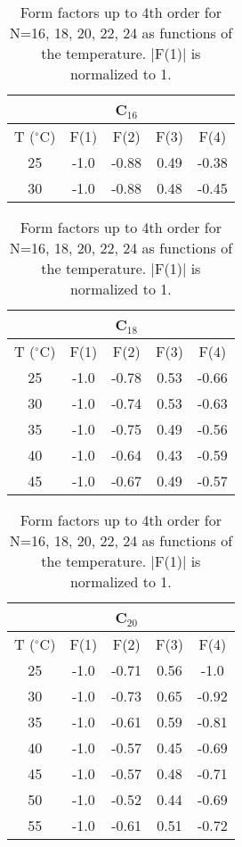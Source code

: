 \begin{table}
\caption{Form factors up to 4th order for N=16, 18, 20, 22, 24 as 
functions of the temperature. |F(1)| is normalized to 1.
\label{long:form}}
\begin{center}
\raggedleft
\hspace{0.1in}
\begin{tabular}{ccccc}
\\ \hline \hline
 & & C$_{16}$ & & \\ \hline
T ($^{\circ}$C) & F(1) & F(2) & F(3) & F(4) \\ \hline
25 & -1.0 & -0.88 & 0.49 & -0.38 \\
30 & -1.0 & -0.88 & 0.48 & -0.45 \\
\hline \hline
\end{tabular}
\raggedright
\hspace{0.2in}
\begin{tabular}{ccccc}
\\ \hline \hline
 & & C$_{18}$ & & \\ \hline
T ($^{\circ}$C) & F(1) & F(2) & F(3) & F(4) \\ \hline
25 & -1.0 & -0.78 & 0.53 & -0.66 \\
30 & -1.0 & -0.74 & 0.53 & -0.63 \\
35 & -1.0 & -0.75 & 0.49 & -0.56 \\
40 & -1.0 & -0.64 & 0.43 & -0.59 \\
45 & -1.0 & -0.67 & 0.49 & -0.57 \\
\hline \hline
\end{tabular}
\end{center}
\begin{center}
\raggedleft
\hspace{0.1in}
\begin{tabular}{ccccc}
\\ \hline \hline
 & & C$_{20}$ & & \\ \hline
T ($^{\circ}$C) & F(1) & F(2) & F(3) & F(4) \\ \hline
25 & -1.0 & -0.71 & 0.56 & -1.0 \\
30 & -1.0 & -0.73 & 0.65 & -0.92 \\
35 & -1.0 & -0.61 & 0.59 & -0.81 \\
40 & -1.0 & -0.57 & 0.45 & -0.69 \\
45 & -1.0 & -0.57 & 0.48 & -0.71 \\
50 & -1.0 & -0.52 & 0.44 & -0.69 \\
55 & -1.0 & -0.61 & 0.51 & -0.72 \\

\end{tabular}
\end{center}
\end{table}
